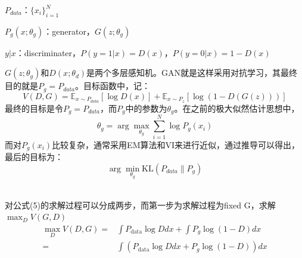 \documentclass[a4paper]{article}
\begin{document}
$P_{data}$：$\{x_i\}_{i=1}^N$

$P_g(x;\theta_g)$：generator，$G(z;\theta_g)$

$y|x$：discriminater，$P(y=1|x)=D(x)$，$P(y=0|x)=1-D(x)$

$G(z;\theta_g)$和$D(x;\theta_d)$是两个多层感知机。GAN就是这样采用对抗学习，其最终目的就是$P_g = P_{data}$。目标函数中，记：
\begin{equation}
    V(D,G) = \mathbb{E}_{x\sim P_{data}}[\log D(x)] + \mathbb{E}_{x\sim P_{z}}[\log (1-D(G(z)))]
\end{equation}
最终的目标是令$P_g = P_{data}$，而$P_g $中的参数为$\theta_g$。在之前的极大似然估计思想中，
\begin{equation}
    \theta_g = \arg\max_{\theta_g} \sum_{i=1}^N \log P_g(x_i)
\end{equation}
而对$P_g(x_i)$比较复杂，通常采用EM算法和VI来进行近似，通过推导可以得出，最后的目标为：
$$\arg\min_{\theta_g} \text{KL}(P_{data}\|P_g)$$

~\\

对公式(5)的求解过程可以分成两步，而第一步为求解过程为fixed G，求解$\max_D V(G,D)$
\begin{equation}
    \begin{split}
        \max_D V(D,G) = & \int P_{\text{data}} \log D dx + \int P_g \log(1-D) dx \\
        =& \int (P_{\text{data}} \log D dx + P_g \log(1-D)) dx
    \end{split}
\end{equation}
\end{document}
